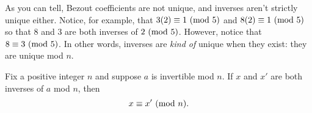 \documentclass[letterpaper]{article}
\begin{document}
As you can tell, Bezout coefficients are not unique, and inverses aren't strictly unique either. Notice, for example, that $3(2) \equiv 1 \ (\mathrm{mod}\ 5)$ and $8(2) \equiv 1 \ (\mathrm{mod}\ 5)$ so that $8$ and $3$ are both inverses of $2 \ (\mathrm{mod}\ 5)$. However, notice that $8 \equiv 3 \ (\mathrm{mod}\ 5)$. In other words, inverses are \emph{kind of} unique when they exist: they are unique mod $n$. 

\begin{lemma}{}{}
    Fix a positive integer $n$ and suppose $a$ is invertible mod $n$. If $x$ and $x'$ are both inverses of $a$ mod $n$, then 
    \[x \equiv x' \ (\mathrm{mod}\ n).\]
\end{lemma}
\end{document}
